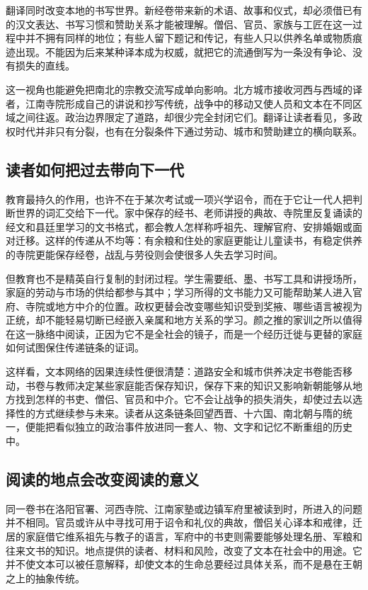 翻译同时改变本地的书写世界。新经卷带来新的术语、故事和仪式，却必须借已有的汉文表达、书写习惯和赞助关系才能被理解。僧侣、官员、家族与工匠在这一过程中并不拥有同样的地位；有些人留下题记和传记，有些人只以供养名单或物质痕迹出现。不能因为后来某种译本成为权威，就把它的流通倒写为一条没有争论、没有损失的直线。

这一视角也能避免把南北的宗教交流写成单向影响。北方城市接收河西与西域的译者，江南寺院形成自己的讲说和抄写传统，战争中的移动又使人员和文本在不同区域之间往返。政治边界限定了道路，却很少完全封闭它们。翻译让读者看见，多政权时代并非只有分裂，也有在分裂条件下通过劳动、城市和赞助建立的横向联系。

\subsection{读者如何把过去带向下一代}

教育最持久的作用，也许不在于某次考试或一项兴学诏令，而在于它让一代人把判断世界的词汇交给下一代。家中保存的经书、老师讲授的典故、寺院里反复诵读的经文和县廷里学习的文书格式，都会教人怎样称呼祖先、理解官府、安排婚姻或面对迁移。这样的传递从不均等：有余粮和住处的家庭更能让儿童读书，有稳定供养的寺院更能保存经卷，战乱与劳役则会使很多人失去学习时间。

但教育也不是精英自行复制的封闭过程。学生需要纸、墨、书写工具和讲授场所，家庭的劳动与市场的供给都参与其中；学习所得的文书能力又可能帮助某人进入官府、寺院或地方中介的位置。政权更替会改变哪些知识受到奖掖、哪些语言被视为正统，却不能轻易切断已经嵌入亲属和地方关系的学习。颜之推的家训之所以值得在这一脉络中阅读，正因为它不是全社会的镜子，而是一个经历迁徙与更替的家庭如何试图保住传递链条的证词。

这样看，文本网络的因果连续性便很清楚：道路安全和城市供养决定书卷能否移动，书卷与教师决定某些家庭能否保存知识，保存下来的知识又影响新朝能够从地方找到怎样的书吏、僧侣、官员和中介。它不会让战争的损失消失，却使过去以选择性的方式继续参与未来。读者从这条链条回望西晋、十六国、南北朝与隋的统一，便能把看似独立的政治事件放进同一套人、物、文字和记忆不断重组的历史中。

\subsection{阅读的地点会改变阅读的意义}

同一卷书在洛阳官署、河西寺院、江南家塾或边镇军府里被读到时，所进入的问题并不相同。官员或许从中寻找可用于诏令和礼仪的典故，僧侣关心译本和戒律，迁居的家庭借它维系祖先与教子的语言，军府中的书吏则需要能够处理名册、军粮和往来文书的知识。地点提供的读者、材料和风险，改变了文本在社会中的用途。它并不使文本可以被任意解释，却使文本的生命总要经过具体关系，而不是悬在王朝之上的抽象传统。

